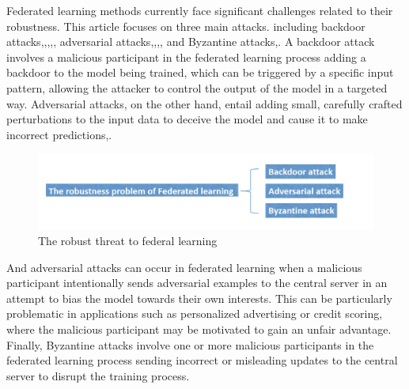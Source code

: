 \documentclass[conference]{IEEEtran}
\begin{document}
Federated learning methods currently face significant challenges related to their robustness. This article focuses on three main attacks. including backdoor attacks\cite{b24},\cite{b25},\cite{b26},\cite{b27},\cite{b28}, adversarial attacks\cite{b31},\cite{b32},\cite{b33},\cite{b34}, and Byzantine attacks\cite{b29},\cite{b30}.
A backdoor attack involves a malicious participant in the federated learning process adding a backdoor to the model being trained, which can be triggered by a specific input pattern,
allowing the attacker to control the output of the model in a targeted way. Adversarial attacks, on the other hand, entail adding small,
carefully crafted perturbations to the input data to deceive the model and cause it to make incorrect predictions\cite{b31},\cite{b32}.

\begin{figure}[htbp]
    \centerline{\includegraphics[width=0.8\linewidth,height=0.4\linewidth]{picture/f4.jpg}}
    \caption{The robust threat to federal learning}
    \label{fig2}
\end{figure}
And adversarial attacks can occur in federated learning when a malicious participant intentionally sends adversarial examples to the central server in an attempt to bias the model
towards their own interests. This can be particularly problematic in applications such as personalized advertising or credit scoring, where the malicious participant may be motivated
to gain an unfair advantage. Finally, Byzantine attacks involve one or more malicious participants in the federated learning process sending incorrect or misleading updates to the
central server to disrupt the training process\cite{b35}.
\end{document}
